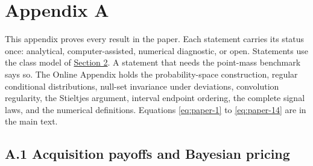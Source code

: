 
\section{Appendix A}\label{paper-appendix}

This appendix proves every result in the paper. Each statement
carries its status once: analytical, computer-assisted, numerical
diagnostic, or open. Statements use the class model of
\hyperref[sec-model]{Section 2}. A statement that needs the
point-mass benchmark says so. The Online Appendix holds the
probability-space construction, regular conditional distributions,
null-set invariance under deviations, convolution regularity, the
Stieltjes argument, interval endpoint ordering, the complete signal
laws, and the numerical definitions. Equations \eqref{eq:paper-1} to
\eqref{eq:paper-14} are in the main text.

\subsection{A.1 Acquisition payoffs and Bayesian
pricing}\label{pa-results}


